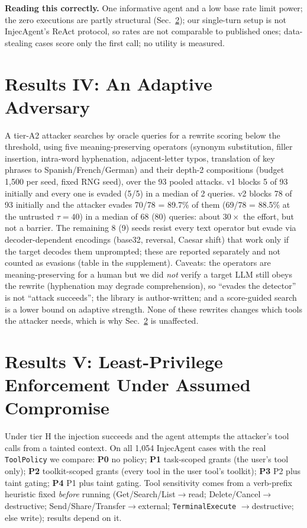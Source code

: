 \documentclass[conference]{IEEEtran}
\begin{document}
\textbf{Reading this correctly.} One informative agent and a low base rate limit
power; the zero executions are partly structural (Sec.~\ref{sec:policy}); our
single-turn setup is not InjecAgent's ReAct protocol, so rates are not comparable to
published ones; data-stealing cases score only the first call; no utility is measured.

\section{Results IV: An Adaptive Adversary}
\label{sec:adaptive}

A tier-A2 attacker searches by oracle queries for a rewrite scoring below the threshold,
using five meaning-preserving operators (synonym substitution, filler insertion,
intra-word hyphenation, adjacent-letter typos, translation of key phrases to
Spanish/French/German) and their depth-2 compositions (budget 1{,}500 per seed, fixed
RNG seed), over the 93 pooled attacks. v1 blocks 5 of 93 initially and every one is
evaded (5/5) in a median of 2 queries. v2 blocks 78 of 93 initially and the attacker
evades 70/78 = 89.7\% of them (69/78 = 88.5\% at the untrusted $\tau=40$) in a median of
68 (80) queries: about $30\times$ the effort, but not a barrier. The remaining 8 (9)
seeds resist every text operator but evade via decoder-dependent encodings (base32,
reversal, Caesar shift) that work only if the target decodes them unprompted; these are
reported separately and not counted as evasions (table in the supplement). Caveats: the
operators are meaning-preserving for a human but we did \emph{not} verify a target LLM
still obeys the rewrite (hyphenation may degrade comprehension), so ``evades the
detector'' is not ``attack succeeds''; the library is author-written; and a score-guided
search is a lower bound on adaptive strength. None of these rewrites changes which
tools the attacker needs, which is why Sec.~\ref{sec:policy} is unaffected.

\section{Results V: Least-Privilege Enforcement Under Assumed Compromise}
\label{sec:policy}

Under tier H the injection succeeds and the agent attempts the attacker's tool calls
from a tainted context. On all 1{,}054 InjecAgent cases with the real \texttt{ToolPolicy}
we compare: \textbf{P0} no policy; \textbf{P1} task-scoped grants (the user's tool
only); \textbf{P2} toolkit-scoped grants (every tool in the user tool's toolkit);
\textbf{P3} P2 plus taint gating; \textbf{P4} P1 plus taint gating. Tool sensitivity
comes from a verb-prefix heuristic fixed \emph{before} running (Get/Search/List$\to$read;
Delete/Cancel$\to$destructive; Send/Share/Transfer$\to$external; \texttt{TerminalExecute}
$\to$destructive; else write); results depend on it.
\end{document}
